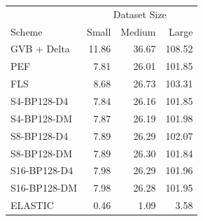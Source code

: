 \begin{tabular}{lrrr}
\toprule
 & \multicolumn{3}{c}{Dataset Size} \\
Scheme & Small & Medium & Large \\
\midrule
GVB + Delta & 11.86 & 36.67 & 108.52 \\
PEF & 7.81 & 26.01 & 101.85 \\
FLS & 8.68 & 26.73 & 103.31 \\
S4-BP128-D4 & 7.84 & 26.16 & 101.85 \\
S4-BP128-DM & 7.87 & 26.19 & 101.98 \\
S8-BP128-D4 & 7.89 & 26.29 & 102.07 \\
S8-BP128-DM & 7.89 & 26.30 & 101.84 \\
S16-BP128-D4 & 7.98 & 26.29 & 101.96 \\
S16-BP128-DM & 7.98 & 26.28 & 101.95 \\
ELASTIC & 0.46 & 1.09 & 3.58 \\
\bottomrule
\end{tabular}
